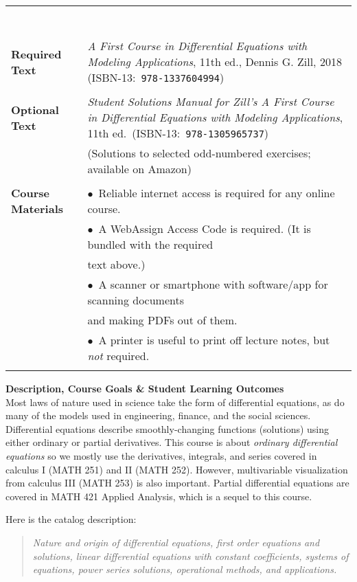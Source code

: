 \documentclass[12pt]{article}
\renewcommand{\emph}[1]{\textsf{\textbf{#1}}}
\newcommand{\localhead}[1]{\par\smallskip\textbf{#1}\nobreak\\}%
\def\heading#1{\localhead{\large\emph{#1}}}
\begin{document}
\begin{tabularx}{\textwidth}{lX}
\begin{tabular}[t]{ll}
                  \end{tabular} \\
 & \\
\emph{Required Text}     & \textsl{A First Course in Differential Equations with Modeling Applications}, 11th ed., Dennis G. Zill, 2018 (ISBN-13:\, \texttt{978-1337604994}) \\
 & \\
\emph{Optional Text}     & \textit{Student Solutions Manual for Zill's A First Course in Differential Equations with Modeling Applications}, 11th ed.~(ISBN-13:\, \texttt{978-1305965737}) \\
    & (Solutions to selected odd-numbered exercises; available on Amazon) \\
 & \\
\emph{Course Materials}  & $\bullet$\, Reliable internet access is required for any online course. \\
                         & $\bullet$\, A WebAssign Access Code is required.  (It is bundled with the required \\
                         & \quad text above.) \\
                         & $\bullet$\, A scanner or smartphone with software/app for scanning documents \\
                         & \quad and making PDFs out of them. \\
                         & $\bullet$\, A printer is useful to print off lecture notes, but \textsl{not} required. \\
 & 
\end{tabularx}

\vfill

\newpage
\cfoot{\thepage}
\strut

\heading{Description, Course Goals \& Student Learning Outcomes}
Most laws of nature used in science take the form of differential equations, as do many of the models used in engineering, finance, and the social sciences.  Differential equations describe smoothly-changing functions (solutions) using either ordinary or partial derivatives.  This course is about \textsl{ordinary differential equations} so we mostly use the derivatives, integrals, and series covered in calculus I (MATH 251) and II (MATH 252).  However, multivariable visualization from calculus III (MATH 253) is also important.  Partial differential equations are covered in MATH 421 Applied Analysis, which is a sequel to this course.

Here is the catalog description:
\begin{quote}
\textsl{Nature and origin of differential equations, first order equations and solutions, linear differential equations with constant coefficients, systems of equations, power series solutions, operational methods, and applications.}
\end{quote}
\end{document}
